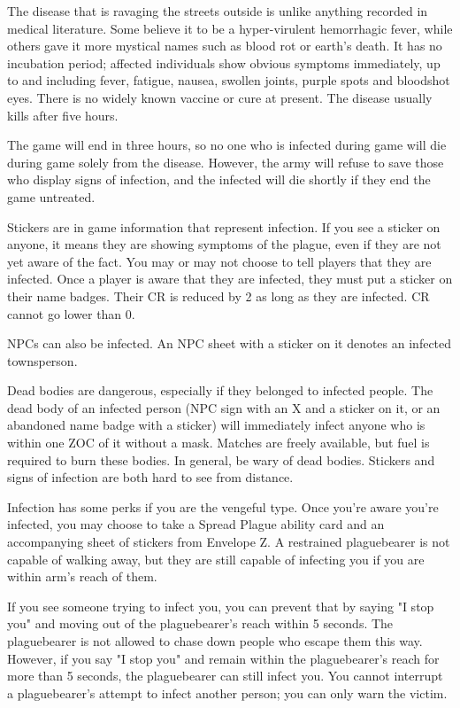 \documentclass[green]{Pestilence}
\begin{document}
\name{\gInfection{}}

The disease that is ravaging the streets outside is unlike anything recorded in medical literature. Some believe it to be a hyper-virulent hemorrhagic fever, while others gave it more mystical names such as blood rot or earth's death. It has no incubation period; affected individuals show obvious symptoms immediately, up to and including fever, fatigue, nausea, swollen joints, purple spots and bloodshot eyes. There is no widely known vaccine or cure at present. The disease usually kills after five hours.

The game will end in three hours, so no one who is infected during game will die during game solely from the disease. However, the army will refuse to save those who display signs of infection, and the infected will die shortly if they end the game untreated.

Stickers are in game information that represent infection. If you see a sticker on anyone, it means they are showing symptoms of the plague, even if they are not yet aware of the fact. You may or may not choose to tell players that they are infected. Once a player is aware that they are infected, they must put a sticker on their name badges. Their CR is reduced by 2 as long as they are infected. CR cannot go lower than 0.

NPCs can also be infected. An NPC sheet with a sticker on it denotes an infected townsperson.

Dead bodies are dangerous, especially if they belonged to infected people. The dead body of an infected person (NPC sign with an X and a sticker on it, or an abandoned name badge with a sticker) will immediately infect anyone who is within one ZOC of it without a mask. Matches are freely available, but fuel is required to burn these bodies. In general, be wary of dead bodies. Stickers and signs of infection are both hard to see from distance.

Infection has some perks if you are the vengeful type. Once you're aware you're infected, you may choose to take a Spread Plague ability card and an accompanying sheet of stickers from Envelope Z. A restrained plaguebearer is not capable of walking away, but they are still capable of infecting you if you are within arm's reach of them. 

If you see someone trying to infect you, you can prevent that by saying "I stop you" and moving out of the plaguebearer's reach within 5 seconds. The plaguebearer is not allowed to chase down people who escape them this way. However, if you say "I stop you" and remain within the plaguebearer's reach for more than 5 seconds, the plaguebearer can still infect you. You cannot interrupt a plaguebearer's attempt to infect another person; you can only warn the victim.    
\end{document}
